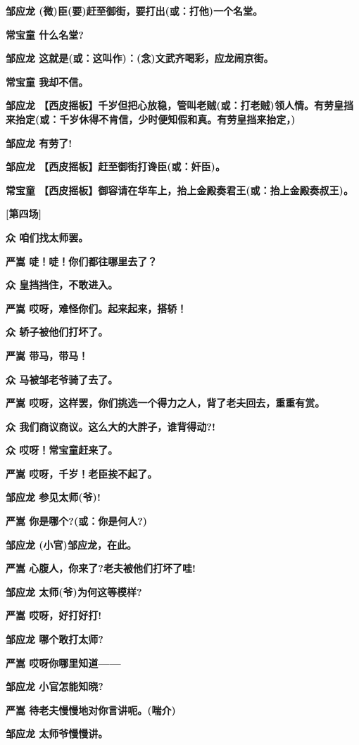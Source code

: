 \textbf{邹应龙 (微)臣(要)赶至御街，要打出(或：打他)一个名堂。}

\textbf{常宝童 什么名堂?}

\textbf{邹应龙 这就是(或：这叫作)：(念)文武齐喝彩，应龙闹京街。}

\textbf{常宝童 我却不信。}

\textbf{邹应龙
【西皮摇板】千岁但把心放稳，管叫老贼(或：打老贼)领人情。有劳皇挡来抬定(或：千岁休得不肯信，少时便知假和真。有劳皇挡来抬定，)}

\textbf{邹应龙 有劳了!}

\textbf{邹应龙 【西皮摇板】赶至御街打谗臣(或：奸臣)。}

\textbf{常宝童
【西皮摇板】御容请在华车上，抬上金殿奏君王(或：抬上金殿奏叔王)。}

\textbf{{[}第四场{]}}

\textbf{众 咱们找太师罢。}

\textbf{严嵩 唗！唗！你们都往哪里去了？}

\textbf{众 皇挡挡住，不敢进入。}

\textbf{严嵩 哎呀，难怪你们。起来起来，搭轿！}

\textbf{众 轿子被他们打坏了。}

\textbf{严嵩 带马，带马！}

\textbf{众 马被邹老爷骑了去了。}

\textbf{严嵩
哎呀，这样罢，你们挑选一个得力之人，背了老夫回去，重重有赏。}

\textbf{众 我们商议商议。这么大的大胖子，谁背得动?!}

\textbf{众 哎呀！常宝童赶来了。}

\textbf{严嵩 哎呀，千岁！老臣挨不起了。}

\textbf{邹应龙 参见太师(爷)!}

\textbf{严嵩 你是哪个?(或：你是何人?)}

\textbf{邹应龙 (小官)邹应龙，在此。}

\textbf{严嵩 心腹人，你来了?老夫被他们打坏了哇!}

\textbf{邹应龙 太师(爷)为何这等模样?}

\textbf{严嵩 哎呀，好打好打!}

\textbf{邹应龙 哪个敢打太师?}

\textbf{严嵩 哎呀你哪里知道------}

\textbf{邹应龙 小官怎能知晓?}

\textbf{严嵩 待老夫慢慢地对你言讲呃。(喘介)}

\textbf{邹应龙 太师爷慢慢讲。}

